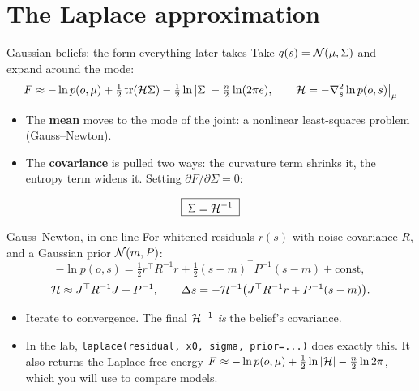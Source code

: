 \documentclass[10pt, aspectratio=169]{beamer}
\begin{document}
\section{The Laplace approximation}

\begin{frame}{Gaussian beliefs: the form everything later takes}
  Take $q(s)=\mathcal{N}(\mu,\Sigma)$ and expand around the mode:
  \[
    F \approx -\ln p(o,\mu) + \tfrac12\operatorname{tr}(\mathcal{H}\Sigma) - \tfrac12\ln|\Sigma| - \tfrac n2\ln(2\pi e),
    \qquad \mathcal{H} = -\nabla^2_s \ln p(o,s)\big|_{\mu}
  \]
  \begin{itemize}
    \item The \textbf{mean} moves to the mode of the joint: a nonlinear least-squares problem
          (Gauss--Newton).
    \item The \textbf{covariance} is pulled two ways: the curvature term shrinks it, the entropy
          term widens it. Setting $\partial F/\partial\Sigma=0$:
  \end{itemize}
  \[ \boxed{\;\Sigma = \mathcal{H}^{-1}\;} \]
\end{frame}

\begin{frame}{Gauss--Newton, in one line}
  For whitened residuals $r(s)$ with noise covariance $R$, and a Gaussian prior $\mathcal{N}(m,P)$:
  \[
    -\ln p(o,s) = \tfrac12 r^\top R^{-1} r + \tfrac12 (s-m)^\top P^{-1}(s-m) + \text{const},
  \]
  \[
    \mathcal{H} \approx J^\top R^{-1} J + P^{-1}, \qquad
    \Delta s = -\mathcal{H}^{-1}\big(J^\top R^{-1} r + P^{-1}(s-m)\big).
  \]
  \begin{itemize}
    \item Iterate to convergence. The final $\mathcal{H}^{-1}$ \emph{is} the belief's covariance.
    \item In the lab, \texttt{laplace(residual, x0, sigma, prior=...)} does exactly this. It also
          returns the Laplace free energy
          $F \approx -\ln p(o,\mu) + \tfrac12\ln|\mathcal{H}| - \tfrac n2\ln 2\pi$,
          which you will use to compare models.
  \end{itemize}
\end{frame}
\end{document}
